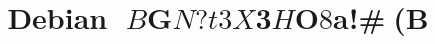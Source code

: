 




\documentclass[cjk,dvipdfm,12pt]{beamer}
\usepackage{monthlypresentation}



\title{Debian $B$G$N?t3X$3$H$O$8$a!#(B}
\subtitle{gnuplot, Octave, R $BF~Lg(B}
\author{$B$^$($@$3$&$X$$(B mkouhei@debian.or.jp \\IRC nick: mkouhei}
\date{2009$BG/(B11$B7n(B14$BF|(B}

